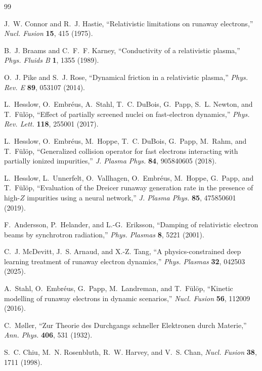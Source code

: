 \documentclass[11pt]{article}
\begin{document}
\begin{thebibliography}{99}

J.~W. Connor and R.~J. Hastie,
``Relativistic limitations on runaway electrons,''
\emph{Nucl. Fusion} \textbf{15}, 415 (1975).

B.~J. Braams and C.~F.~F. Karney,
``Conductivity of a relativistic plasma,''
\emph{Phys. Fluids B} \textbf{1}, 1355 (1989).

O.~J. Pike and S.~J. Rose,
``Dynamical friction in a relativistic plasma,''
\emph{Phys. Rev. E} \textbf{89}, 053107 (2014).

L.~Hesslow, O.~Embr\'eus, A.~Stahl, T.~C. DuBois, G.~Papp,
S.~L. Newton, and T.~F{\"u}l{\"o}p,
``Effect of partially screened nuclei on fast-electron dynamics,''
\emph{Phys. Rev. Lett.} \textbf{118}, 255001 (2017).

L.~Hesslow, O.~Embr\'eus, M.~Hoppe, T.~C. DuBois, G.~Papp,
M.~Rahm, and T.~F{\"u}l{\"o}p,
``Generalized collision operator for fast electrons interacting with partially ionized impurities,''
\emph{J. Plasma Phys.} \textbf{84}, 905840605 (2018).

L.~Hesslow, L.~Unnerfelt, O.~Vallhagen, O.~Embr\'eus, M.~Hoppe,
G.~Papp, and T.~F{\"u}l{\"o}p,
``Evaluation of the Dreicer runaway generation rate in the presence of high-$Z$ impurities using a neural network,''
\emph{J. Plasma Phys.} \textbf{85}, 475850601 (2019).

F.~Andersson, P.~Helander, and L.-G.~Eriksson,
``Damping of relativistic electron beams by synchrotron radiation,''
\emph{Phys. Plasmas} \textbf{8}, 5221 (2001).

C.~J. McDevitt, J.~S. Arnaud, and X.-Z. Tang,
``A physics-constrained deep learning treatment of runaway electron dynamics,''
\emph{Phys. Plasmas} \textbf{32}, 042503 (2025).

A.~Stahl, O.~Embr{\'e}us, G.~Papp, M.~Landreman, and T.~F{\"u}l{\"o}p,
``Kinetic modelling of runaway electrons in dynamic scenarios,''
\emph{Nucl. Fusion} \textbf{56}, 112009 (2016).

C.~M{\o}ller,
``Zur Theorie des Durchgangs schneller Elektronen durch Materie,''
\emph{Ann. Phys.} \textbf{406}, 531 (1932).

S.~C. Chiu, M.~N. Rosenbluth, R.~W. Harvey, and V.~S. Chan,
\emph{Nucl. Fusion} \textbf{38}, 1711 (1998).


\end{thebibliography}
\end{document}
